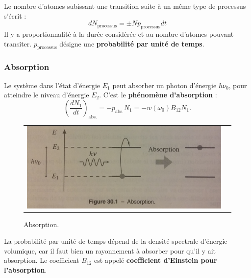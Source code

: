 \documentclass[11pt,a4paper]{report}
\begin{document}
Le nombre d'atomes subissant une transition suite à un même type de processus s'écrit :
\begin{equation}
	\boxed{dN_\text{processus} = \pm N p_\text{processus} dt}
\end{equation}
Il y a proportionnalité à la durée considérée et au nombre d'atomes pouvant transiter. $p_\text{processus}$ désigne une \textbf{probabilité par unité de temps}.

\subsubsection{Absorption}

Le système dans l'état d'énergie $E_1$ peut absorber un photon d'énergie $h\nu_0$, pour atteindre le niveau d'énergie $E_2$. C'est le \textbf{phénomène d'absorption} :
\begin{equation}
	\boxed{\left(\frac{dN_1}{dt} \right)_\text{abs.} = - p_\text{abs.}N_1 = - w(\omega_0)B_{12}N_1}.
\end{equation}
\begin{figure}[h!]
\begin{center}
	\begin{tabular}{cc}
		\includegraphics[scale = 0.55]{absorption.png}
	\end{tabular}
\end{center}
\caption{Absorption.}
\end{figure}
La probabilité par unité de temps dépend de la densité spectrale d'énergie volumique, car il faut bien un rayonnement à absorber pour qu'il y ait absorption. Le coefficient $B_{12}$ est appelé \textbf{coefficient d'Einstein pour l'absorption}.
\end{document}
